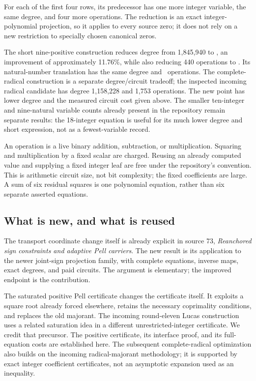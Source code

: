 \documentclass[11pt]{article}
\theoremstyle{definition}
\theoremstyle{remark}
\begin{document}
For each of the first four rows, its predecessor has one more integer
variable, the same degree, and four more operations. The reduction is an
exact integer-polynomial projection, so it applies to every source zero;
it does not rely on a new restriction to specially chosen canonical zeros.

The short nine-positive construction reduces degree from 1,845,940 to
\CheapDegree, an improvement of approximately 11.76\%, while also reducing
440 operations to \CheapOps. Its natural-number translation has the same
degree and \CheapNaturalOps\ operations. The complete-radical construction
is a separate degree/circuit tradeoff; the inspected incoming radical
candidate has degree 1,158,228 and 1,753 operations. The new point has lower
degree and the measured circuit cost given above. The smaller ten-integer
and nine-natural variable counts already present in the repository remain
separate results: the 18-integer equation is useful for its much lower degree
and short expression, not as a fewest-variable record.

An operation is a live binary addition, subtraction, or multiplication.
Squaring and multiplication by a fixed scalar are charged. Reusing an
already computed value and supplying a fixed integer leaf are free under
the repository's convention. This is arithmetic circuit size, not bit
complexity; the fixed coefficients are large. A sum of six residual squares
is one polynomial equation, rather than six separate asserted equations.

\subsection{What is new, and what is reused}

The transport coordinate change itself is already explicit in source 73,
\emph{Reanchored sign constraints and adaptive Pell carriers}. The new
result is its application to the newer joint-sign projection family, with
complete equations, inverse maps, exact degrees, and paid circuits. The
argument is elementary; the improved endpoint is the contribution.

The saturated positive Pell certificate changes the certificate itself.
It exploits a square root already forced elsewhere, retains the necessary
coprimality conditions, and replaces the old majorant. The incoming
round-eleven Lucas construction uses a related saturation idea in a
different unrestricted-integer certificate. We credit that precursor.
The positive certificate, its interface proof, and its full-equation
costs are established here. The subsequent complete-radical optimization
also builds on the incoming radical-majorant methodology; it is supported
by exact integer coefficient certificates, not an asymptotic expansion
used as an inequality.
\end{document}

